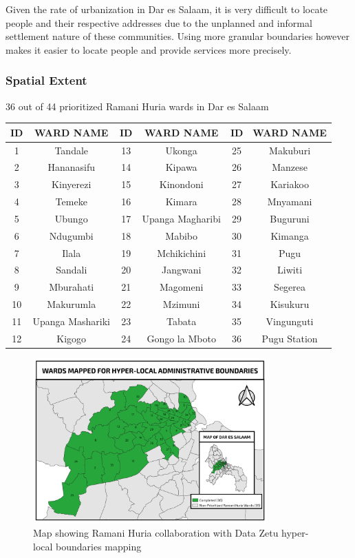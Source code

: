 \documentclass[a4paper,12pt,twoside]{article}
\begin{document}
Given the rate of urbanization in Dar es Salaam, it is very difficult to locate people and their respective addresses due to the unplanned and informal settlement nature of these   communities. Using more granular boundaries however makes it easier to locate people and provide services more precisely.  

\subsubsection{Spatial Extent}
36 out of 44 prioritized Ramani Huria wards in Dar es Salaam

\begin{center}
\begin{tabular}{|c|c|c|c|c|c|}
\hline
ID & WARD NAME & ID & WARD NAME & ID & WARD NAME\\
\hline
1  &  Tandale &  13 &   Ukonga &  25  &  Makuburi\\
2  &  Hananasifu &  14  &  Kipawa &  26  &  Manzese\\
3  &  Kinyerezi &  15  &  Kinondoni &  27  &  Kariakoo\\
4 &  Temeke &  16  &  Kimara &  28  &  Mnyamani\\
5  &  Ubungo &  17  &  Upanga Magharibi &  29  &  Buguruni\\
6 &   Ndugumbi &  18  &  Mabibo &  30  &  Kimanga\\
7 &   Ilala &  19  &  Mchikichini &  31  &  Pugu\\
8 &   Sandali &  20  &  Jangwani &  32  &  Liwiti\\
9  &  Mburahati &  21  &  Magomeni &  33  &  Segerea\\
10  &  Makurumla &  22  &  Mzimuni &  34  &  Kisukuru\\
11  &  Upanga Mashariki &  23  &  Tabata &  35  &  Vingunguti\\
12  &  Kigogo &  24  &  Gongo la Mboto &  36  & Pugu Station\\
 \hline
\end{tabular}
\end{center}

\begin{figure}[h]
  \color{RHgreen}\caption{Map showing Ramani Huria collaboration with Data Zetu hyper-local boundaries mapping}
  \centering
 \includegraphics[width=0.8\textwidth]{images/hyperlocal_boundary.png}
\end{figure}
\end{document}

